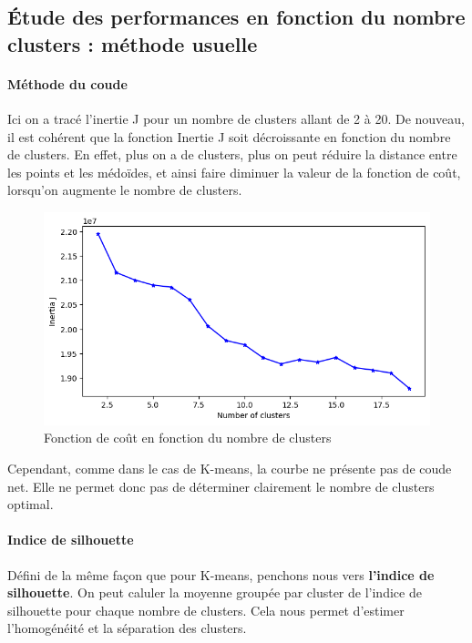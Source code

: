 \documentclass[french,a4paper,18pt]{article}
\begin{document}
\subsection{Étude des performances en fonction du nombre clusters : méthode usuelle}

\paragraph{Méthode du coude}

Ici on a tracé l'inertie J pour un nombre de clusters allant de 2 à 20. De nouveau, il est cohérent que la fonction Inertie J 
soit décroissante en fonction du nombre de clusters. En effet, plus on a de clusters, plus on peut réduire la distance 
entre les points et les médoïdes, et ainsi faire diminuer la valeur de la fonction de coût, lorsqu'on augmente le nombre de clusters. 

\begin{figure}[h!]
    \centering
    \includegraphics[scale=0.4]{../images/mnist_kmedoids_inertia.png}
    \caption{Fonction de coût en fonction du nombre de clusters}\label{fig:mnist_kmedoids_cost}
\end{figure}

Cependant, comme dans le cas de K-means, la courbe ne présente pas de coude net.
Elle ne permet donc pas de déterminer clairement le nombre de clusters optimal.

\paragraph{Indice de silhouette}

Défini de la même façon que pour K-means, penchons nous vers \textbf{l'indice de silhouette}.
On peut caluler la moyenne groupée par cluster de l'indice de silhouette pour chaque nombre de clusters.
Cela nous permet d'estimer l'homogénéité et la séparation des clusters.
\end{document}
